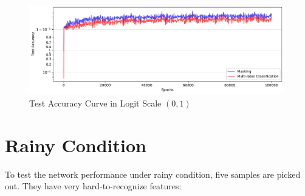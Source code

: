 \begin{spacing}{1.5}
\begin{figure}[ht]
\centering
\includegraphics[width=0.99\textwidth, fbox]{Chapter5/testacc.pdf}
\caption{Test Accuracy Curve in Logit Scale $(0,1)$}
\label{fig:testacc} 
\end{figure}

\section{Rainy Condition}
\label{sec:EX_rainy}

To test the network performance under rainy condition, five samples are picked out. They have very hard-to-recognize features: 


\end{spacing}
